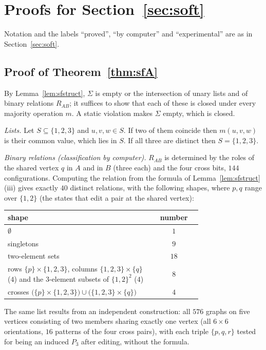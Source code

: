 \section{Proofs for Section~\ref{sec:soft}}\label{app:soft}
Notation and the labels ``proved'', ``by computer'' and ``experimental'' are as in Section~\ref{sec:soft}.

\subsection{Proof of Theorem~\ref{thm:sfA}}\label{app:softA}
By Lemma~\ref{lem:sfstruct}, $\Sigma$ is empty or the intersection of unary lists and of binary relations $R_{AB}$; it suffices to show that each of these is closed under every majority operation $m$. A static violation makes $\Sigma$ empty, which is closed.

\emph{Lists.} Let $S\subseteq\{1,2,3\}$ and $u,v,w\in S$. If two of them coincide then $m(u,v,w)$ is their common value, which lies in $S$. If all three are distinct then $S=\{1,2,3\}$.

\emph{Binary relations (classification by computer).} $R_{AB}$ is determined by the roles of the shared vertex $q$ in $A$ and in $B$ (three each) and the four cross bits, $144$ configurations. Computing the relation from the formula of Lemma~\ref{lem:sfstruct}(iii) gives exactly $40$ distinct relations, with the following shapes, where $p,q$ range over $\{1,2\}$ (the states that edit a pair at the shared vertex):
\begin{center}
\begin{tabular}{@{}p{0.75\linewidth}c@{}}
shape & number\\\hline
$\emptyset$ & $1$\\
singletons & $9$\\
two-element sets & $18$\\
rows $\{p\}\times\{1,2,3\}$, columns $\{1,2,3\}\times\{q\}$ ($4$) and the $3$-element subsets of $\{1,2\}^2$ ($4$) & $8$\\
crosses $\bigl(\{p\}\times\{1,2,3\}\bigr)\cup\bigl(\{1,2,3\}\times\{q\}\bigr)$ & $4$
\end{tabular}
\end{center}
The same list results from an independent construction: all $576$ graphs on five vertices consisting of two members sharing exactly one vertex (all $6\times6$ orientations, $16$ patterns of the four cross pairs), with each triple $\{p,q,r\}$ tested for being an induced $P_3$ after editing, without the formula.

